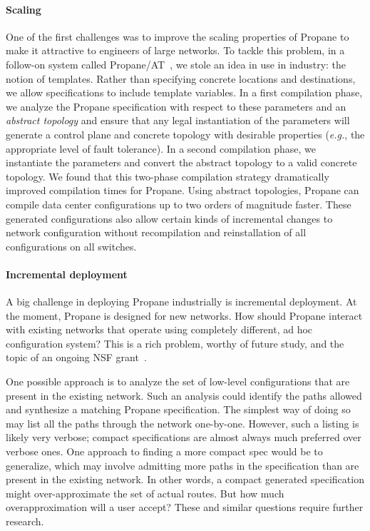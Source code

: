 \documentclass[10pt]{sigalternate052015}
\begin{document}
\paragraph*{Scaling} One of the first challenges was to improve the scaling
properties of Propane to make it attractive to engineers of large
networks.  To tackle this problem, in a follow-on system called Propane/AT~\cite{abstract-propane}, we stole an idea in use in
industry: the notion of templates.  Rather than specifying concrete
locations and destinations, we allow specifications to include
template variables.  In a first compilation phase, we analyze the
Propane specification with respect to these parameters and an
\emph{abstract topology} and ensure that any legal instantiation of
the parameters will generate a control plane and concrete topology
with desirable properties (\emph{e.g.}, the appropriate level of fault
tolerance).  In a second compilation phase, we instantiate the
parameters and convert the abstract topology to a valid concrete
topology.  We found that this two-phase compilation strategy
dramatically improved compilation times for Propane.  Using abstract
topologies, Propane can compile data center configurations up to two
orders of magnitude faster.  These generated configurations also
allow certain kinds of incremental changes to network configuration
without recompilation and reinstallation of all configurations on all
switches.  

\paragraph*{Incremental deployment}  A big challenge in
deploying Propane industrially is incremental deployment. 
At the moment, Propane is designed for new
networks. How should Propane interact
with existing networks that operate using completely different, ad
hoc configuration system?  This is a rich problem, worthy of future
study, and the topic of an ongoing NSF grant~\cite{nsf-propane}.

One possible approach is to analyze the set of
low-level configurations that are present in the existing
network.  Such an analysis could identify the paths allowed and
synthesize a matching Propane specification.  The simplest way of
doing so may list all the paths through the network one-by-one.
However, such a listing is likely very verbose; compact specifications
are almost always much preferred over verbose ones.  One approach to
finding a more compact spec would be to generalize, which may involve
admitting more paths in the specification than are present in the
existing network.  In other words, a compact generated specification
might over-approximate the set of actual routes.  But how much
overapproximation will a user accept?  These and similar questions
require further research.  
\end{document}
